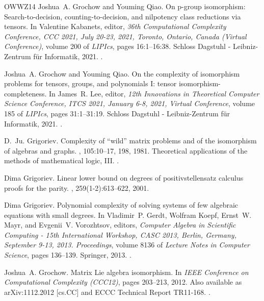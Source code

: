 \documentclass[10pt,a4paper]{article}
\theoremstyle{definition}
\begin{document}
\begin{thebibliography}{OWWZ14}
Joshua~A. Grochow and Youming Qiao.
\newblock On p-group isomorphism: Search-to-decision, counting-to-decision, and
  nilpotency class reductions via tensors.
\newblock In Valentine Kabanets, editor, {\em 36th Computational Complexity
  Conference, {CCC} 2021, July 20-23, 2021, Toronto, Ontario, Canada (Virtual
  Conference)}, volume 200 of {\em LIPIcs}, pages 16:1--16:38. Schloss Dagstuhl
  - Leibniz-Zentrum f{\"{u}}r Informatik, 2021.
\newblock \href {https://doi.org/10.4230/LIPIcs.CCC.2021.16}
  {}.

Joshua~A. Grochow and Youming Qiao.
\newblock On the complexity of isomorphism problems for tensors, groups, and
  polynomials {I:} tensor isomorphism-completeness.
\newblock In James~R. Lee, editor, {\em 12th Innovations in Theoretical
  Computer Science Conference, {ITCS} 2021, January 6-8, 2021, Virtual
  Conference}, volume 185 of {\em LIPIcs}, pages 31:1--31:19. Schloss Dagstuhl
  - Leibniz-Zentrum f{\"{u}}r Informatik, 2021.
\newblock \href {https://doi.org/10.4230/LIPIcs.ITCS.2021.31}
  {}.

D.~Ju. Grigoriev.
\newblock Complexity of ``wild'' matrix problems and of the isomorphism of
  algebras and graphs.
,
  105:10--17, 198, 1981.
\newblock Theoretical applications of the methods of mathematical logic, III.
\newblock \href {https://doi.org/10.1007/BF01084390}
  {}.

Dima Grigoriev.
\newblock Linear lower bound on degrees of positivstellensatz calculus proofs
  for the parity.
, 259(1-2):613--622, 2001.

Dima Grigoriev.
\newblock Polynomial complexity of solving systems of few algebraic equations
  with small degrees.
\newblock In Vladimir~P. Gerdt, Wolfram Koepf, Ernst~W. Mayr, and Evgenii~V.
  Vorozhtsov, editors, {\em Computer Algebra in Scientific Computing - 15th
  International Workshop, {CASC} 2013, Berlin, Germany, September 9-13, 2013.
  Proceedings}, volume 8136 of {\em Lecture Notes in Computer Science}, pages
  136--139. Springer, 2013.
\newblock \href {https://doi.org/10.1007/978-3-319-02297-0\_11}
  {}.

Joshua~A. Grochow.
\newblock Matrix {Lie} algebra isomorphism.
\newblock In {\em IEEE Conference on Computational Complexity (CCC12)}, pages
  203--213, 2012.
\newblock Also available as arXiv:1112.2012 [cs.CC] and ECCC Technical Report
  TR11-168.
\newblock \href {https://doi.org/10.1109/CCC.2012.34}
  {}.


\end{thebibliography}
\end{document}

